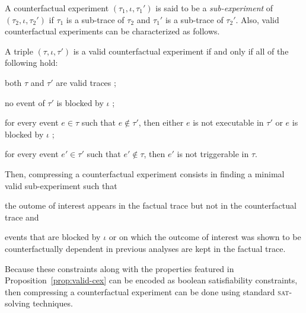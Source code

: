 A counterfactual experiment $(\tau_1, \iota, \tau_1')$ is said to be a
\emph{sub-experiment} of $(\tau_2, \iota, \tau_2')$ if $\tau_1$ is a
sub-trace of $\tau_2$ and $\tau_1'$ is a sub-trace of $\tau_2'$. Also,
valid counterfactual experiments can be characterized as follows.

\begin{proposition}%
  \label{prop:valid-cex}
  A triple $(\tau, \iota, \tau')$ is a valid counterfactual experiment if
  and only if all of the following hold:
  \begin{inparaenum}[(1)]
  \item \label{valid-cex:valid-traces} both $\tau$ and $\tau'$ are
    valid traces ;
  \item \label{valid-cex:no-blocking} no event of $\tau'$ is blocked
    by $\iota$ ;
  \item \label{valid-cex:co-occur} for every event $e \in \tau$
    such that $e \notin \tau'$, then either $e$ is not
    executable in $\tau'$ or $e$ is blocked by
    $\iota$ ;
  \item \label{valid-cex:co-occur2} for every event $e' \in \tau'$
    such that $e' \notin \tau$, then $e'$ is not triggerable in
    $\tau$.
  \end{inparaenum}
\end{proposition}

\noindent Then, compressing a counterfactual experiment consists
in finding a minimal valid sub-experiment such that
\begin{inparaenum}[(i)]
\item the outome of interest appears in the factual trace but not in
the counterfactual trace and
\item events that are blocked by $\iota$ or on which the outcome of
  interest was shown to be counterfactually dependent in previous
  analyses are kept in the factual trace.
\end{inparaenum}
Because these constraints along with the properties featured in
Proposition~\ref{prop:valid-cex} can be encoded as boolean
satisfiability constraints, then compressing a counterfactual
experiment can be done using standard \textsc{sat}-solving techniques.

